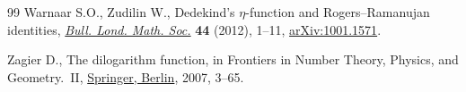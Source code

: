 \documentclass[pdftex]{sigma}
\numberwithin{equation}{section}
\theoremstyle{definition}
\begin{document}
\begin{thebibliography}{99}
Warnaar S.O., Zudilin W., Dedekind's {$\eta$}-function and
 {R}ogers--{R}amanujan identities,
 \href{https://doi.org/10.1112/blms/bdr019}{\textit{Bull. Lond. Math. Soc.}}
 \textbf{44} (2012), 1--11,
 \href{http://arxiv.org/abs/1001.1571}{arXiv:1001.1571}.

Zagier D., The dilogarithm function, in Frontiers in Number Theory, Physics, and Geometry.~{II},
 \href{https://doi.org/10.1007/978-3-540-30308-4_1}{Springer, Berlin}, 2007,
 3--65.

\end{thebibliography}\LastPageEnding
\end{document}
